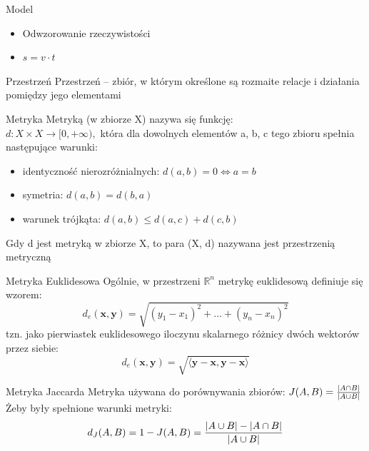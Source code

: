 \documentclass[a4paper]{beamer}
\begin{document}
\begin{frame}
\begin{block}{Model}
\begin{itemize}
\item Odwzorowanie rzeczywistości
\item $s = v \cdot t$
\end{itemize}
\end{block}
\pause
\begin{block}{Przestrzeń}
Przestrzeń – zbiór, w którym określone są rozmaite relacje i działania pomiędzy jego elementami
\end{block}
\begin{block}{Metryka}
Metryką (w zbiorze X) nazywa się funkcję: \\
$d: X \times X \to [0, +\infty),$
która dla dowolnych elementów a, b, c tego zbioru spełnia następujące warunki:
\begin{itemize}
\item identyczność nierozróżnialnych: $d(a, b) = 0 \iff a = b$
\item symetria: $d(a, b) = d(b, a)$
\item warunek trójkąta: $d(a, b) \leqslant d(a, c) + d(c, b)$
\end{itemize}
Gdy d jest metryką w zbiorze X, to para (X, d) nazywana jest przestrzenią metryczną
\end{block}
\end{frame}
\begin{frame}
\begin{block}{Metryka Euklidesowa}
Ogólnie, w przestrzeni $\mathbb R^n$ metrykę euklidesową definiuje się wzorem:
$$d_e(\mathbf x, \mathbf y) = \sqrt{(y_1 - x_1)^2 + \dots + (y_n - x_n)^2}$$
tzn. jako pierwiastek euklidesowego iloczynu skalarnego różnicy dwóch wektorów przez siebie:
$$d_e(\mathbf x, \mathbf y) = \sqrt{\langle \mathbf y - \mathbf x, \mathbf y - \mathbf x \rangle}$$
\end{block}
\pause
\begin{block}{Metryka Jaccarda}
Metryka używana do porównywania zbiorów:
$J(A,B) = {{|A \cap B|}\over{|A \cup B|}}$ \\
Żeby były spełnione warunki metryki:
$$d_J(A,B) = 1 - J(A,B) = { { |A \cup B| - |A \cap B| } \over |A \cup B| }$$
\end{block}
\end{frame}
\end{document}
